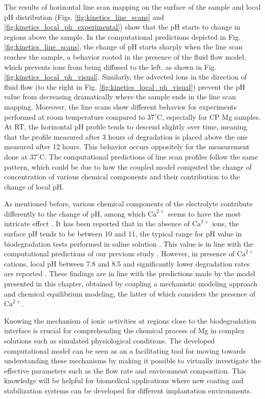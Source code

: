 The results of horizontal line scan mapping on the surface of the sample and local pH distribution (Figs. \ref{fig:kinetics_line_scans} and \ref{fig:kinetics_local_ph_experimental}) show that the pH starts to change in regions above the sample. In the computational predictions depicted in Fig. \ref{fig:kinetics_line_scans}, the change of pH starts sharply when the line scan reaches the sample, a behavior rooted in the presence of the fluid flow model, which prevents ions from being diffused to the left, as shown in Fig. \ref{fig:kinetics_local_ph_visual}. Similarly, the advected ions in the direction of fluid flow (to the right in Fig. \ref{fig:kinetics_local_ph_visual}) prevent the pH value from decreasing dramatically where the sample ends in the line scan mapping. Moreover, the line scans show different behavior for experiments performed at room temperature compared to $37^{\circ}\text{C}$, especially for \gls{CP} Mg samples. At \gls{RT}, the horizontal pH profile tends to descend slightly over time, meaning that the profile measured after 3 hours of degradation is placed above the one measured after 12 hours. This behavior occurs oppositely for the measurement done at $37^{\circ}\text{C}$. The computational predictions of line scan profiles follow the same pattern, which could be due to how the coupled model computed the change of concentration of various chemical components and their contribution to the change of local pH.

As mentioned before, various chemical components of the electrolyte contribute differently to the change of pH, among which $\mathrm{Ca}^{2+}$ seems to have the most intricate effect \cite{Willumeit-Roemer2019}. It has been reported that in the absence of $\mathrm{Ca}^{2+}$ ions, the surface pH tends to be between 10 and 11, the typical range for pH value in biodegradation tests performed in saline solution \cite{Gonzalez2021}. This value is in line with the computational predictions of our previous study \cite{Barzegari2021}. However, in presence of $\mathrm{Ca}^{2+}$ cations, local pH between 7.8 and 8.5 and significantly lower degradation rates are reported \cite{Mei2019,Gnedenkov2019,Tefashe2015,Lamaka2009}. These findings are in line with the predictions made by the model presented in this chapter, obtained by coupling a mechanistic modeling approach and chemical equilibrium modeling, the latter of which considers the presence of $\mathrm{Ca}^{2+}$.

Knowing the mechanism of ionic activities at regions close to the biodegradation interface is crucial for comprehending the chemical process of Mg in complex solutions such as simulated physiological conditions. The developed computational model can be seen as an a facilitating tool for moving towards understanding these mechanisms by making it possible to virtually investigate the effective parameters such as the flow rate and environment composition. This knowledge will be helpful for biomedical applications where new coating and stabilization systems can be developed for different implantation environments.

